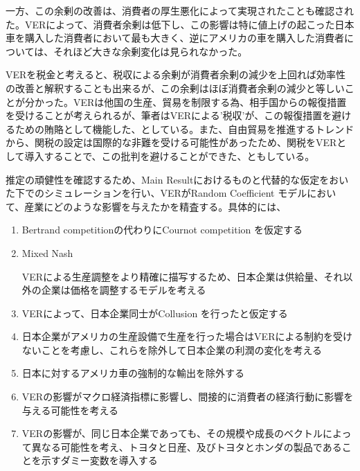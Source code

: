 \documentclass{jsarticle}
\begin{document}
\begin{enumerate}
 一方、この余剰の改善は、消費者の厚生悪化によって実現されたことも確認された。VERによって、消費者余剰は低下し、この影響は特に値上げの起こった日本車を購入した消費者において最も大きく、逆にアメリカの車を購入した消費者については、それほど大きな余剰変化は見られなかった。
 
 VERを税金と考えると、税収による余剰が消費者余剰の減少を上回れば効率性の改善と解釈することも出来るが、この余剰はほぼ消費者余剰の減少と等しいことが分かった。VERは他国の生産、貿易を制限する為、相手国からの報復措置を受けることが考えられるが、筆者はVERによる'税収'が、この報復措置を避けるための賄賂として機能した、としている。また、自由貿易を推進するトレンドから、関税の設定は国際的な非難を受ける可能性があったため、関税をVERとして導入することで、この批判を避けることができた、ともしている。
 
 \vspace{2zw}
 
 推定の頑健性を確認するため、Main Resultにおけるものと代替的な仮定をおいた下でのシミュレーションを行い、VERがRandom Coefficient モデルにおいて、産業にどのような影響を与えたかを精査する。具体的には、
 
  \begin{enumerate}
  
  \item Bertrand competitionの代わりにCournot competition を仮定する
  
  \item  Mixed Nash 
  
  VERによる生産調整をより精確に描写するため、日本企業は供給量、それ以外の企業は価格を調整するモデルを考える
  
  \item VERによって、日本企業同士がCollusion を行ったと仮定する
  
  \item 日本企業がアメリカの生産設備で生産を行った場合はVERによる制約を受けないことを考慮し、これらを除外して日本企業の利潤の変化を考える
  
 \item 日本に対するアメリカ車の強制的な輸出を除外する
 
 \item VERの影響がマクロ経済指標に影響し、間接的に消費者の経済行動に影響を与える可能性を考える
 
 \item VERの影響が、同じ日本企業であっても、その規模や成長のベクトルによって異なる可能性を考え、トヨタと日産、及びトヨタとホンダの製品であることを示すダミー変数を導入する
 

\end{enumerate}
\end{enumerate}
\end{document}
